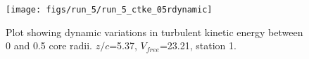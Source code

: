 \begin{figure}[H]
\centering
\texttt{[image: figs/run\_5/run\_5\_ctke\_05rdynamic]}
\caption{Plot showing dynamic variations in turbulent kinetic energy between 0 and 0.5 core radii. $z/c$=5.37, $V_{free}$=23.21, station 1.}
\label{fig:run_5_ctke_05rdynamic}
\end{figure}



